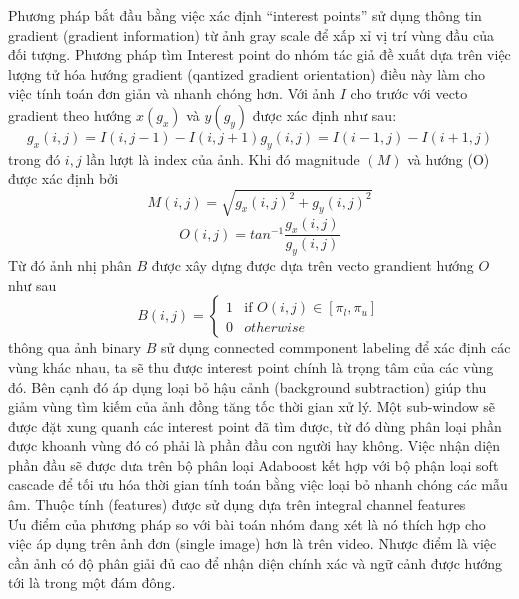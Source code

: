 \documentclass[12pt,a4paper]{article}
\begin{document}
Phương pháp bắt đầu bằng việc xác định “interest points” sử dụng thông tin gradient (gradient information) từ ảnh gray scale để xấp xỉ vị trí vùng đầu của đối tượng. Phương pháp tìm Interest point do nhóm tác giả đề xuất dựa trên việc lượng tử hóa hướng gradient (qantized gradient orientation) điều này làm cho việc tính toán đơn giản và nhanh chóng hơn. Với ảnh $I$ cho trước với vecto gradient theo hướng $x(g_x)$ và $y(g_y)$ được xác định  như sau:
\begin{equation}
g_x(i,j) = I(i,j-1) - I(i,j+1)
g_y(i,j) = I(i-1,j) - I(i+1,j)
\end{equation}
trong đó $i,j$ lần lượt là index của ảnh. Khi đó magnitude $(M)$ và hướng (O) được xác định bởi
\begin{equation}
M(i,j) = \sqrt{g_x(i,j)^2+g_y(i,j)^2}
\end{equation}
\begin{equation}
O(i,j) = tan^{-1}\frac{g_x(i,j)}{g_y(i,j)}
\end{equation}
Từ đó ảnh nhị phân $B$ được xây dựng được dựa trên vecto grandient hướng $O$ như sau
\begin{equation}
    B(i,j) = \begin{cases} 1 & \mbox{if }  O(i,j) \in [\pi_l,\pi_u] \\ 0 & otherwise \end{cases}
\end{equation}
thông qua ảnh binary $B$ sử dụng connected commponent labeling\cite{Fast connected component labeling} để xác định các vùng khác nhau, ta sẽ thu được interest point chính là trọng tâm của các vùng đó. Bên cạnh đó áp dụng loại bỏ hậu cảnh (background subtraction) giúp thu giảm vùng tìm kiếm của ảnh đồng tăng tốc thời gian xử lý. Một sub-window sẽ được đặt xung quanh các interest point đã tìm được, từ đó dùng phân loại phần được khoanh vùng đó có phải là phần đầu con người hay không. Việc nhận diện phần đầu sẽ được dưa trên bộ phân loại Adaboost kết hợp với bộ phận loại soft cascade để tối ưu hóa thời gian tính toán bằng việc loại bỏ nhanh chóng các mẫu âm. Thuộc tính (features) được sử dụng dựa trên integral channel features \cite{Integral channel features}  \\

Ưu điểm của phương pháp so với bài toán nhóm đang xét là nó thích hợp cho việc áp dụng trên ảnh đơn (single image) hơn là trên video. Nhược điểm là việc cần ảnh có độ phân giải đủ cao để nhận diện chính xác và ngữ cảnh được hướng tới là trong một đám đông. \\
\end{document}
